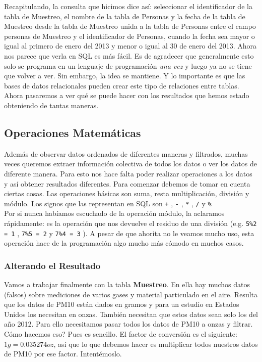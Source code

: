 \documentclass[10pt,letterpaper]{article}
\newcommand{\inlinecode}[1]{
\colorbox{light-gray}{\texttt{#1}}
}
\begin{document}
Recapitulando, la consulta que hicimos dice as\'i: seleccionar el identificador de la tabla de Muestreo, el nombre de la tabla de Personas y la fecha de la tabla de Muestreo desde la tabla de Muestreo unida a la tabla de Personas entre el campo personas de Muestreo y el identificador de Personas, cuando la fecha sea mayor o igual al primero de enero del 2013 y menor o igual al 30 de enero del 2013. Ahora nos parece que verla en SQL es m\'as f\'acil. Es de agradecer que generalmente esto solo se programa en un lenguaje de programaci\'on \emph{una vez} y luego ya no se tiene que volver a ver. Sin embargo, la idea se mantiene. Y lo importante es que las bases de datos relacionales pueden crear este tipo de relaciones entre tablas. Ahora pasaremos a ver qu\'e se puede hacer con los resultados que hemos estado obteniendo de tantas maneras.

\subsection{Operaciones Matem\'aticas}
Adem\'as de observar datos ordenados de diferentes maneras y filtrados, muchas veces queremos extraer informaci\'on colectiva de todos los datos o ver los datos de diferente manera. Para esto nos hace falta poder realizar operaciones a los datos y as\'i obtener resultados diferentes. Para comenzar debemos de tomar en cuenta ciertas cosas. Las operaciones b\'asicas son suma, resta multiplicaci\'on, divisi\'on y m\'odulo. Los signos que las representan en SQL son \inlinecode{+}, \inlinecode{-}, \inlinecode{*}, \inlinecode{/} y \inlinecode{\%}\\

Por si nunca hab\'iamos escuchado de la operaci\'on m\'odulo, la aclaramos r\'apidamente: es la operaci\'on que nos devuelve el residuo de una divisi\'on (e.g. \inlinecode{5\%2 = 1}, \inlinecode{7\%5 = 2} y \inlinecode{7\%4 = 3}). A pesar de que ahorita no le veamos mucho uso, esta operaci\'on hace de la programaci\'on algo mucho m\'as c\'omodo en muchos casos.

\subsubsection{Alterando el Resultado}
Vamos a trabajar finalmente con la tabla \textbf{Muestreo}. En ella hay muchos datos (falsos) sobre mediciones de varios gases y material particulado en el aire. Resulta que los datos de PM10 est\'an dados en gramos y para un estudio en Estados Unidos los necesitan en onzas. Tambi\'en necesitan que estos datos sean solo los del a\~no 2012. Para ello necesitamos pasar todos los datos de PM10 a onzas y filtrar. C\'omo hacemos eso? Pues es sencillo. El factor de conversi\'on es el siguiente: $1g = 0.035274 oz$, as\'i que lo que debemos hacer es multiplicar todos nuestros datos de PM10 por ese factor. Intent\'emoslo.\\
\end{document}
